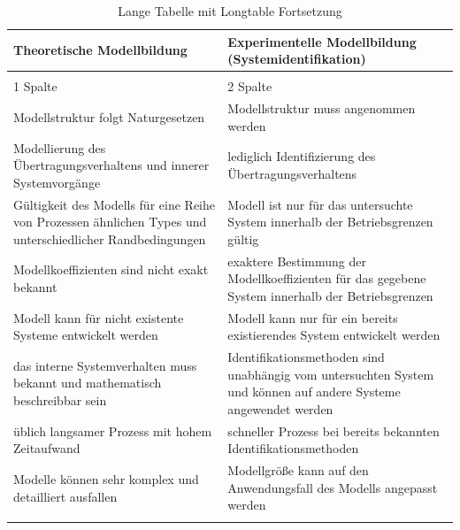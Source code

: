 \begin{longtable}{p{7.0cm} p{7.0cm}}
	\caption{Eigenschaften theoretischer und experimenteller Modellierungsansätze \cite{Isermann.2011}} \\ \toprule
	\textbf{Theoretische Modellbildung} & \textbf{Experimentelle Modellbildung (Systemidentifikation)} \\
	\hline
	\endfirsthead %
	\caption{Lange Tabelle mit Longtable Fortsetzung}\\
	1 Spalte & 2 Spalte\\
	\hline
	\endhead %
	\hline
	
	Modellstruktur folgt Naturgesetzen & Modellstruktur muss angenommen werden\\ \hline
	Modellierung des Übertragungsverhaltens und innerer Systemvorgänge & lediglich Identifizierung des Übertragungsverhaltens\\ \hline
	Gültigkeit des Modells für eine Reihe von Prozessen ähnlichen Types und unterschiedlicher Randbedingungen & Modell ist nur für das untersuchte System innerhalb der Betriebsgrenzen gültig\\ \hline
	Modellkoeffizienten sind nicht exakt bekannt & exaktere Bestimmung der Modellkoeffizienten für das gegebene System innerhalb der Betriebsgrenzen\\ \hline
	Modell kann für nicht existente Systeme entwickelt werden & Modell kann nur für ein bereits existierendes System entwickelt werden\\ \hline
	das interne Systemverhalten muss bekannt und mathematisch beschreibbar sein & Identifikationsmethoden sind unabhängig vom untersuchten System und können auf andere Systeme angewendet werden\\ \hline
	üblich langsamer Prozess mit hohem Zeitaufwand & schneller Prozess bei bereits bekannten Identifikationsmethoden\\ \hline
	Modelle können sehr komplex und detailliert ausfallen & Modellgröße kann auf den Anwendungsfall des Modells angepasst werden\\
	\bottomrule
	\label{tab:modeling_methods} 
\end{longtable}



